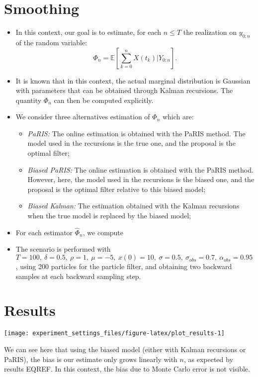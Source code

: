 \documentclass[]{article}
\providecommand{\tightlist}{%
  \setlength{\itemsep}{0pt}\setlength{\parskip}{0pt}}
\begin{document}
\section{Smoothing}\label{smoothing}

\begin{itemize}
\item
  In this context, our goal is to estimate, for each \(n\leq T\) the
  realization on \(y_{0:n}\) of the random variable:
  \[\Phi_n = \mathbb{E}\left[\sum_{k = 0}^{n} X(t_k)\vert Y_{0:n}\right].\]
\item
  It is known that in this context, the actual marginal distribution is
  Gaussian with parameters that can be obtained through Kalman
  recursions. The quantity \(\Phi_n\) can then be computed explicitly.
\item
  We consider three alternatives estimation of \(\Phi_n\) which are:

  \begin{itemize}
  \tightlist
  \item
    \emph{PaRIS:} The online estimation is obtained with the PaRIS
    method. The model used in the recursions is the true one, and the
    proposal is the optimal filter;
  \item
    \emph{Biased PaRIS:} The online estimation is obtained with the
    PaRIS method. However, here, the model used in the recursions is the
    biased one, and the proposal is the optimal filter relative to this
    biased model;
  \item
    \emph{Biased Kalman:} The estimation obtained with the Kalman
    recursions when the true model is replaced by the biased model;
  \end{itemize}
\item
  For each estimator \(\hat{\Phi}_n\), we compute
\item
  The scenario is performed with
  \(T = 100,~\delta = 0.5,~\rho = 1,~\mu = -5,~x(0) = 10,~\sigma = 0.5,~\sigma_{obs} = 0.7,~\alpha_{obs} = 0.95\),
  using 200 particles for the particle filter, and obtaining two
  backward samples at each backward sampling step.
\end{itemize}

\section{Results}\label{results}

\begin{center}\texttt{[image: experiment\_settings\_files/figure-latex/plot\_results-1]} \end{center}

We can see here that using the biased model (either with Kalman
recursions or PaRIS), the bias is our estimate only grows linearly with
\(n\), as expected by results EQREF. In this context, the bias due to
Monte Carlo error is not visible.
\end{document}
